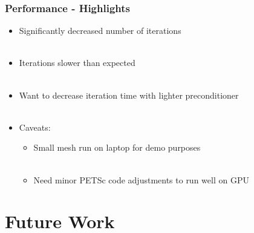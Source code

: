 \documentclass{beamer}
\begin{document}
\begin{frame}
\begin{center}
\frametitle{Performance - Highlights}

\begin{itemize}

\item Significantly decreased number of iterations\\

~\\

\item Iterations slower than expected\\

~\\

\item Want to decrease iteration time with lighter preconditioner\\

~\\

\item Caveats:

\begin{itemize}

\item Small mesh run on laptop for demo purposes\\

~\\

\item Need minor PETSc code adjustments to run well on GPU

\end{itemize}

\end{itemize}

\end{center}
\end{frame}

\section{Future Work}
\end{document}
